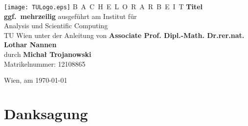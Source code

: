 \documentclass[a4paper,11pt,bibliography=totoc,listof=totoc,headinclude=true,cleardoublepage=empty,oneside]{scrbook}
\begin{document}


\begin{titlepage}
  \begin{center}
    \texttt{[image: TULogo.eps]}
    \vskip 1cm%
    {\LARGE B~\Large A~C~H~E~L~O~R~A~R~B~E~I~T}
    \vskip 8mm
    {\huge\bfseries\color{change}Titel \\[1ex] ggf.\ mehrzeilig}
    \vskip 1cm
    \large 
    ausgef\"uhrt am    
    \vskip 0.75cm
    {\Large Institut f\"ur\\[1ex] Analysis und Scientific Computing}\\[1ex]
    {\Large TU Wien}
    \vskip0.75cm
    unter der Anleitung von
    \vskip0.75cm
    {\Large\bfseries 
Associate Prof. Dipl.-Math. Dr.rer.nat. Lothar Nannen}\\[1ex]
    \vskip 0.5cm
    durch
    \vskip 0.5cm
    {\Large\bfseries Michał Trojanowski}\\[1ex]
    Matrikelnummer: 12108865\\[1ex]
  \end{center}
  
  \vfill
  
  \small
  Wien, am \today
  \vspace*{-15mm}
\end{titlepage}

\cleardoublepage


\chapter*{Danksagung} %
\thispagestyle{empty}
\end{document}
